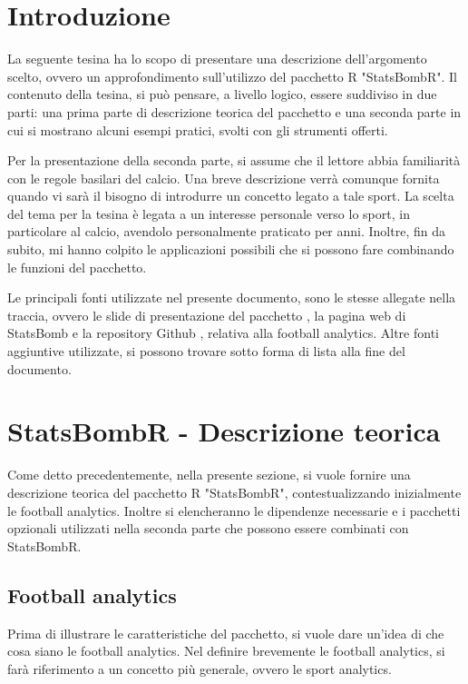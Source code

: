 \section{Introduzione}
            La seguente tesina ha lo scopo di presentare una descrizione dell'argomento scelto, ovvero un approfondimento sull'utilizzo del pacchetto R "StatsBombR". Il contenuto della tesina, si può pensare, a livello logico, essere suddiviso in due parti: una prima parte di descrizione teorica del pacchetto e una seconda parte in cui si mostrano alcuni esempi pratici, svolti con gli strumenti offerti. 

            Per la presentazione della seconda parte, si assume che il lettore abbia familiarità con le regole basilari del calcio. Una breve descrizione verrà comunque fornita quando vi sarà il bisogno di introdurre un concetto legato a tale sport. La scelta del tema per la tesina è legata a un interesse personale verso lo sport, in particolare al calcio, avendolo personalmente praticato per anni. Inoltre, fin da subito, mi hanno colpito le applicazioni possibili che si possono fare combinando le funzioni del pacchetto.

            Le principali fonti utilizzate nel presente documento, sono le stesse allegate nella traccia, ovvero le slide di presentazione del pacchetto \cite{slideSBR}, la pagina web di StatsBomb \cite{StatsBomb} e la repository Github \cite{FCrSTATSGithub}, relativa alla football analytics. Altre fonti aggiuntive utilizzate, si possono trovare sotto forma di lista alla fine del documento.


\section{StatsBombR - Descrizione teorica}
    Come detto precedentemente, nella presente sezione, si vuole fornire una descrizione teorica del pacchetto R "StatsBombR", contestualizzando inizialmente le football analytics. Inoltre si elencheranno le dipendenze necessarie e i pacchetti opzionali utilizzati nella seconda parte che possono essere combinati con StatsBombR.

    \subsection{Football analytics}
        Prima di illustrare le caratteristiche del pacchetto, si vuole dare un'idea di che cosa siano le football analytics. Nel definire brevemente le football analytics, si farà riferimento a un concetto più generale, ovvero le sport analytics. 
        
